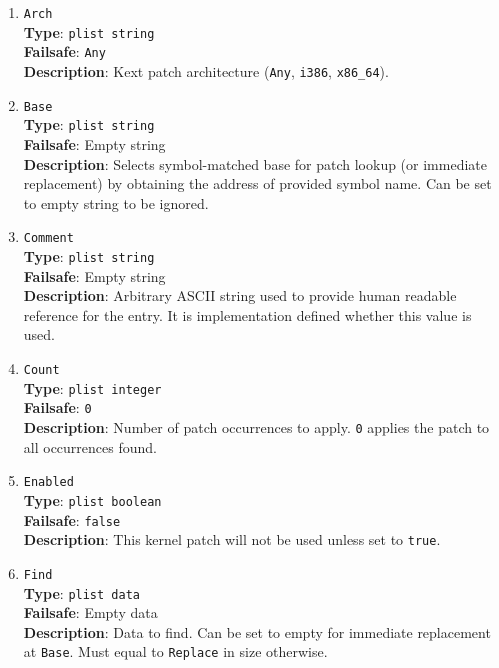 \documentclass[]{article}
\begin{document}
\begin{enumerate}
\item
  \texttt{Arch}\\
  \textbf{Type}: \texttt{plist\ string}\\
  \textbf{Failsafe}: \texttt{Any}\\
  \textbf{Description}: Kext patch architecture (\texttt{Any}, \texttt{i386}, \texttt{x86\_64}).

\item
  \texttt{Base}\\
  \textbf{Type}: \texttt{plist\ string}\\
  \textbf{Failsafe}: Empty string\\
  \textbf{Description}: Selects symbol-matched base for patch lookup (or immediate
  replacement) by obtaining the address of provided symbol name. Can be set to
  empty string to be ignored.

\item
  \texttt{Comment}\\
  \textbf{Type}: \texttt{plist\ string}\\
  \textbf{Failsafe}: Empty string\\
  \textbf{Description}: Arbitrary ASCII string used to provide human readable
  reference for the entry. It is implementation defined whether this value is
  used.

\item
  \texttt{Count}\\
  \textbf{Type}: \texttt{plist\ integer}\\
  \textbf{Failsafe}: \texttt{0}\\
  \textbf{Description}: Number of patch occurrences to apply. \texttt{0} applies
  the patch to all occurrences found.

\item
  \texttt{Enabled}\\
  \textbf{Type}: \texttt{plist\ boolean}\\
  \textbf{Failsafe}: \texttt{false}\\
  \textbf{Description}: This kernel patch will not be used unless set to
  \texttt{true}.

\item
  \texttt{Find}\\
  \textbf{Type}: \texttt{plist\ data}\\
  \textbf{Failsafe}: Empty data\\
  \textbf{Description}: Data to find. Can be set to empty for immediate
  replacement at \texttt{Base}. Must equal to \texttt{Replace} in size
  otherwise.


\end{enumerate}
\end{document}
